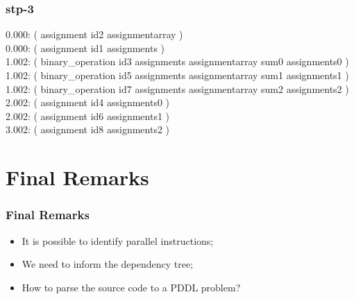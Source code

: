 \documentclass{beamer}
\begin{document}
\begin{frame}
  \frametitle{stp-3}

  {\scriptsize
    0.000: ( assignment id2 assignmentarray )\\
    0.000: ( assignment id1 assignments )\\
    1.002: ( binary\_operation id3 assignments assignmentarray sum0 assignments0 )\\
    1.002: ( binary\_operation id5 assignments assignmentarray sum1 assignments1 )\\
    1.002: ( binary\_operation id7 assignments assignmentarray sum2 assignments2 )\\
    2.002: ( assignment id4 assignments0 )\\
    2.002: ( assignment id6 assignments1 )\\
    3.002: ( assignment id8 assignments2 )\\
  }
\end{frame}


\section{Final Remarks}

\begin{frame}
  \frametitle{Final Remarks}

  \begin{itemize}
    \item It is possible to identify parallel instructions;
  \end{itemize}
  \bigbreak
  \bigbreak
  \begin{itemize}
    \item We need to inform the dependency tree;
    \item How to parse the source code to a PDDL problem?
  \end{itemize}
\end{frame}
\end{document}
